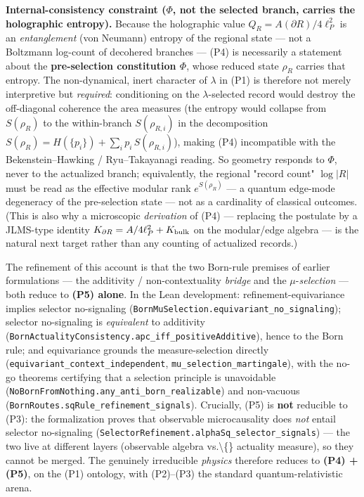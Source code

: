 \documentclass[11pt,a4paper]{article}
\begin{document}
\textbf{Internal-consistency constraint ($\Phi$, not the selected branch, carries the holographic entropy).} Because the holographic value $Q_R = A(\partial R)/4\ell_P^2$ is an \emph{entanglement} (von Neumann) entropy of the regional state — not a Boltzmann log-count of decohered branches — (P4) is necessarily a statement about the \textbf{pre-selection constitution $\Phi$}, whose reduced state $\rho_R$ carries that entropy. The non-dynamical, inert character of $\lambda$ in (P1) is therefore not merely interpretive but \emph{required}: conditioning on the $\lambda$-selected record would destroy the off-diagonal coherence the area measures (the entropy would collapse from $S(\rho_R)$ to the within-branch $S(\rho_{R,i})$ in the decomposition $S(\rho_R) = H(\{p_i\}) + \sum_i p_i\,S(\rho_{R,i})$), making (P4) incompatible with the Bekenstein–Hawking / Ryu–Takayanagi reading. So geometry responds to $\Phi$, never to the actualized branch; equivalently, the regional "record count" $\log|R|$ must be read as the effective modular rank $e^{S(\rho_R)}$ — a quantum edge-mode degeneracy of the pre-selection state — not as a cardinality of classical outcomes. (This is also why a microscopic \emph{derivation} of (P4) — replacing the postulate by a JLMS-type identity $K_{\partial R} = A/4\ell_P^2 + K_{\rm bulk}$ on the modular/edge algebra — is the natural next target rather than any counting of actualized records.)

The refinement of this account is that the two Born-rule premises of earlier formulations — the additivity / non-contextuality \emph{bridge} and the $\mu$-\emph{selection} — both reduce to \textbf{(P5) alone}. In the Lean development: refinement-equivariance implies selector no-signaling (\texttt{BornMuSelection.equivariant\_no\_signaling}); selector no-signaling is \emph{equivalent} to additivity (\texttt{BornActualityConsistency.apc\_iff\_positiveAdditive}), hence to the Born rule; and equivariance grounds the measure-selection directly (\texttt{equivariant\_context\_independent}, \texttt{mu\_selection\_martingale}), with the no-go theorems certifying that a selection principle is unavoidable (\texttt{NoBornFromNothing.any\_anti\_born\_realizable}) and non-vacuous (\texttt{BornRoutes.sqRule\_refinement\_signals}). Crucially, (P5) is \textbf{not} reducible to (P3): the formalization proves that observable microcausality does \emph{not} entail selector no-signaling (\texttt{SelectorRefinement.alphaSq\_selector\_signals}) — the two live at different layers (observable algebra vs.\textbackslash\{\} actuality measure), so they cannot be merged. The genuinely irreducible \emph{physics} therefore reduces to \textbf{(P4) + (P5)}, on the (P1) ontology, with (P2)–(P3) the standard quantum-relativistic arena.
\end{document}
